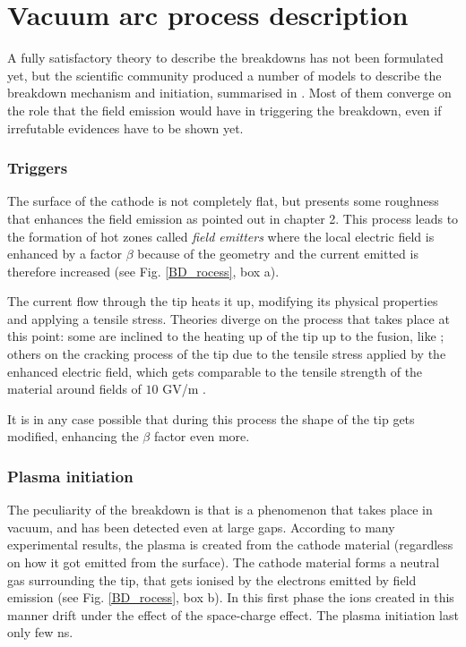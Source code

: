\section[Vacuum arc process description]{Vacuum arc process description}

A fully satisfactory theory to describe the breakdowns has not been formulated yet, but the scientific community produced a number of models to describe the breakdown mechanism and initiation, summarised in \cite{soviet:1983,davies:triggers}. Most of them converge on the role that the field emission would have in triggering the breakdown, even if irrefutable  evidences have to be shown yet.

\subsubsection[Triggers]{Triggers}

The surface of the cathode is not completely flat, but presents some roughness that enhances the field emission as pointed out in chapter 2. This process leads to the formation of hot zones called \textit{field emitters} where the local electric field is enhanced by a factor $\beta$ because of the geometry and the current emitted is therefore increased (see Fig. \ref{BD_rocess}, box a). 

The current flow through the tip heats it up, modifying its physical properties and applying a tensile stress. Theories diverge on the process that takes place at this point: some are inclined to the heating up of the tip up to the fusion, like \cite{Grudiev:newLoc}; others on the cracking process of the tip due to the tensile stress applied by the enhanced electric field, which gets comparable to the tensile strength of the material around fields of $10$ GV/m  \cite{Insepov:1373092}.

It is in any case possible that during this process the shape of the tip gets modified, enhancing the $\beta$ factor even more.


\subsubsection[Plasma initiation]{Plasma initiation}

The peculiarity of the breakdown is that is a phenomenon that takes place in vacuum, and has been detected even at large gaps. According to many experimental results, the plasma is created from the cathode material (regardless on how it got emitted from the surface). The cathode material forms a neutral gas surrounding the tip, that gets ionised by the electrons emitted by field emission (see Fig. \ref{BD_rocess}, box b). In this first phase the ions created in this manner drift under the effect of the space-charge effect. The plasma initiation last only few ns.

